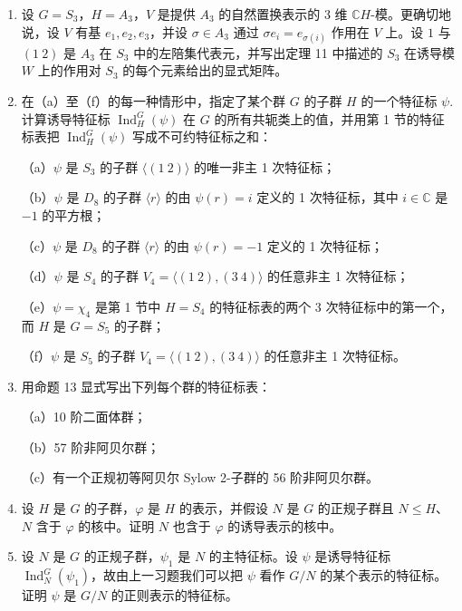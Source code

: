 \begin{enumerate}
\item 设 \(G = S_3\)，\(H = A_3\)，\(V\) 是提供 \(A_3\) 的自然置换表示的 3 维 \(\mathbb{C}H\)-模。更确切地说，设 \(V\) 有基 \(e_1, e_2, e_3\)，并设 \(\sigma \in A_3\) 通过 \(\sigma e_i = e_{\sigma(i)}\) 作用在 \(V\) 上。设 \(1\) 与 \((1\ 2)\) 是 \(A_3\) 在 \(S_3\) 中的左陪集代表元，并写出定理 11 中描述的 \(S_3\) 在诱导模 \(W\) 上的作用对 \(S_3\) 的每个元素给出的显式矩阵。

\item 在（a）至（f）的每一种情形中，指定了某个群 \(G\) 的子群 \(H\) 的一个特征标 \(\psi\). 计算诱导特征标 \(\operatorname{Ind}_H^G(\psi)\) 在 \(G\) 的所有共轭类上的值，并用第 1 节的特征标表把 \(\operatorname{Ind}_H^G(\psi)\) 写成不可约特征标之和：

（a）\(\psi\) 是 \(S_3\) 的子群 \(\langle(1\ 2)\rangle\) 的唯一非主 1 次特征标；

（b）\(\psi\) 是 \(D_8\) 的子群 \(\langle r\rangle\) 的由 \(\psi(r) = i\) 定义的 1 次特征标，其中 \(i \in \mathbb{C}\) 是 \(-1\) 的平方根；

（c）\(\psi\) 是 \(D_8\) 的子群 \(\langle r\rangle\) 的由 \(\psi(r) = -1\) 定义的 1 次特征标；

（d）\(\psi\) 是 \(S_4\) 的子群 \(V_4 = \langle(1\ 2), (3\ 4)\rangle\) 的任意非主 1 次特征标；

（e）\(\psi = \chi_4\) 是第 1 节中 \(H = S_4\) 的特征标表的两个 3 次特征标中的第一个，而 \(H\) 是 \(G = S_5\) 的子群；

（f）\(\psi\) 是 \(S_5\) 的子群 \(V_4 = \langle(1\ 2), (3\ 4)\rangle\) 的任意非主 1 次特征标。

\item 用命题 13 显式写出下列每个群的特征标表：

（a）10 阶二面体群；

（b）57 阶非阿贝尔群；

（c）有一个正规初等阿贝尔 Sylow 2-子群的 56 阶非阿贝尔群。

\item 设 \(H\) 是 \(G\) 的子群，\(\varphi\) 是 \(H\) 的表示，并假设 \(N\) 是 \(G\) 的正规子群且 \(N \leq H\)、\(N\) 含于 \(\varphi\) 的核中。证明 \(N\) 也含于 \(\varphi\) 的诱导表示的核中。

\item 设 \(N\) 是 \(G\) 的正规子群，\(\psi_1\) 是 \(N\) 的主特征标。设 \(\psi\) 是诱导特征标 \(\operatorname{Ind}_N^G(\psi_1)\)，故由上一习题我们可以把 \(\psi\) 看作 \(G/N\) 的某个表示的特征标。证明 \(\psi\) 是 \(G/N\) 的正则表示的特征标。


\end{enumerate}
